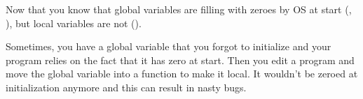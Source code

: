 
Now that you know that global variables are filling with zeroes by \ac{OS} at start
(, ),
but local variables are not ().

Sometimes, you have a global variable that you forgot to initialize and your program relies on the fact that it has
zero at start.
Then you edit a program and move the global variable into a function to make it local.
It wouldn't be zeroed at initialization anymore and this can result in nasty bugs.

